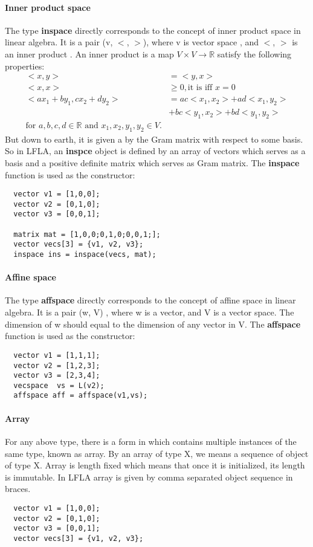 \documentclass[12pt]{article} %
\begin{document}
\paragraph{Inner product space}
The type \textbf{inspace} directly corresponds to the concept of inner product space in linear algebra. It is a  pair (v, $<$, $>$), where v is vector space , and $<$, $>$ is an inner product .
An inner product is a map $V\times V \to \mathbb{R}$ satisfy the following properties:
\begin{align*}
	<x, y> &= <y,x> \\
	<x,x> &\geq 0, \text{it is  iff } x = 0 \\
	<ax_1 + by_1, cx_2 + dy_2> &= ac<x_1,x_2> + ad<x_1,y_2> \\
         & + bc<y_1,x_2> +bd<y_1,y_2> \\
	\text{for } a,b,c,d \in \mathbb{R} \text{ and } x_1,x_2,y_1,y_2 \in V.
\end{align*}
But down to earth, it is given a by the Gram matrix with respect to some basis.  So in LFLA, an \textbf{inspce} object is defined by an array of vectors which serves as  a basis  and a positive definite matrix which serves as Gram matrix. The \textbf{inspace} function is used as the constructor:
 \begin{lstlisting}
  vector v1 = [1,0,0];
  vector v2 = [0,1,0];
  vector v3 = [0,0,1];
   
  matrix mat = [1,0,0;0,1,0;0,0,1;];
  vector vecs[3] = {v1, v2, v3};
  inspace ins = inspace(vecs, mat); 
\end{lstlisting}

\paragraph{Affine space}
The type \textbf{affspace} directly corresponds to the concept of affine space in linear algebra. It is a pair
(w, V) , where w is a vector, and V is a vector space. The dimension of w should equal to the dimension of any vector in V. The \textbf{affspace} function is used as the constructor:
 \begin{lstlisting} 
  vector v1 = [1,1,1];
  vector v2 = [1,2,3];
  vector v3 = [2,3,4];
  vecspace  vs = L(v2);
  affspace aff = affspace(v1,vs);
\end{lstlisting}
\paragraph{Array}
For any above type, there is a form in which contains multiple instances of the same type, known as array. By an array of type X, we means a sequence of object of type X. Array is length fixed which means that once it is initialized, its length is immutable. In LFLA  array is  given by  comma separated object sequence in braces.  
 \begin{lstlisting}
  vector v1 = [1,0,0];
  vector v2 = [0,1,0];
  vector v3 = [0,0,1];  
  vector vecs[3] = {v1, v2, v3}; 
\end{lstlisting}
\end{document}
